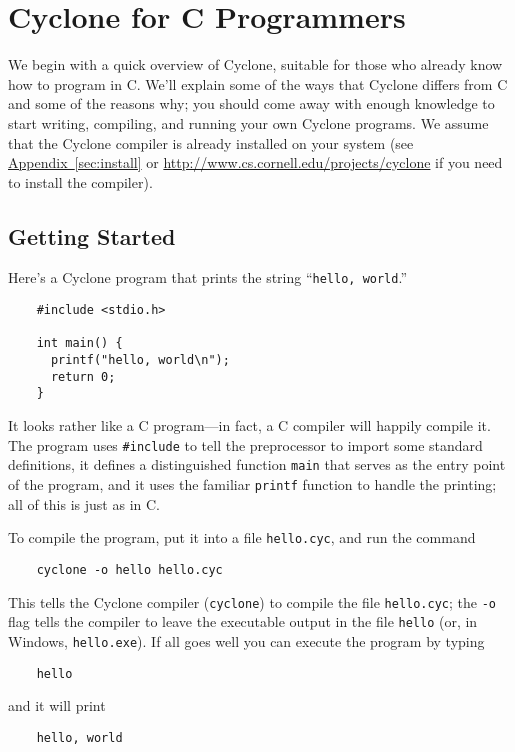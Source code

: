 \section{Cyclone for C Programmers}

We begin with a quick overview of Cyclone, suitable for those who
already know how to program in C\@.  We'll explain some of the ways
that Cyclone differs from C and some of the reasons why; you should
come away with enough knowledge to start writing, compiling, and
running your own Cyclone programs.  We assume that the Cyclone
compiler is already installed on your system (see
\hyperref[{sec:install}]{Appendix~\ref{sec:install}} or \href{http://www.cs.cornell.edu/projects/cyclone}{http://www.cs.cornell.edu/projects/cyclone}
if you need to install the compiler).

\subsection{Getting Started}

Here's a Cyclone program that prints the string ``\texttt{hello,
  world}.''
\begin{verbatim}
    #include <stdio.h>

    int main() {
      printf("hello, world\n");
      return 0;
    }
\end{verbatim}

It looks rather like a C program---in fact, a C compiler will happily
compile it.  The program uses \texttt{\#include} to tell the
preprocessor to import some standard definitions, it defines a
distinguished function \texttt{main} that serves as the entry point of
the program, and it uses the familiar \texttt{printf} function to
handle the printing; all of this is just as in C\@.

To compile the program, put it into a file \texttt{hello.cyc}, and run
the command
\begin{verbatim}
    cyclone -o hello hello.cyc 
\end{verbatim}
This tells the Cyclone compiler (\texttt{cyclone}) to compile the file
\texttt{hello.cyc}; the \texttt{-o} flag tells the compiler to leave
the executable output in the file \texttt{hello} (or, in Windows,
\texttt{hello.exe}).  If all goes well you can execute the program by
typing
\begin{verbatim}
    hello
\end{verbatim}
and it will print
\begin{verbatim}
    hello, world
\end{verbatim}

